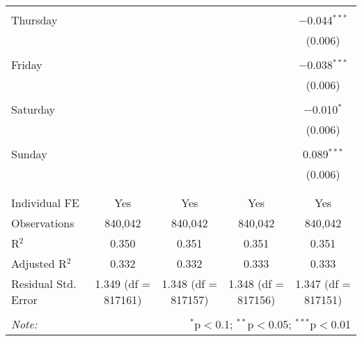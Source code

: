 \documentclass[
]{article}
\begin{document}
\begin{table}[!htbp]
{\begin{tabular}{@{\extracolsep{5pt}}lcccc}
  & & & & \\ 
 Thursday &  &  &  & $-$0.044$^{***}$ \\ 
  &  &  &  & (0.006) \\ 
  & & & & \\ 
 Friday &  &  &  & $-$0.038$^{***}$ \\ 
  &  &  &  & (0.006) \\ 
  & & & & \\ 
 Saturday &  &  &  & $-$0.010$^{*}$ \\ 
  &  &  &  & (0.006) \\ 
  & & & & \\ 
 Sunday &  &  &  & 0.089$^{***}$ \\ 
  &  &  &  & (0.006) \\ 
  & & & & \\ 
\hline \\[-1.8ex] 
Individual FE & Yes & Yes & Yes & Yes \\ 
Observations & 840,042 & 840,042 & 840,042 & 840,042 \\ 
R$^{2}$ & 0.350 & 0.351 & 0.351 & 0.351 \\ 
Adjusted R$^{2}$ & 0.332 & 0.332 & 0.333 & 0.333 \\ 
Residual Std. Error & 1.349 (df = 817161) & 1.348 (df = 817157) & 1.348 (df = 817156) & 1.347 (df = 817151) \\ 
\hline 
\hline \\[-1.8ex] 
\textit{Note:}  & \multicolumn{4}{r}{$^{*}$p$<$0.1; $^{**}$p$<$0.05; $^{***}$p$<$0.01} \\ 
\end{tabular}
} 
\end{table} 
\newpage
\end{document}
